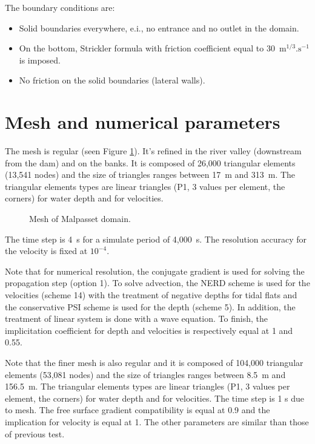 \bigskip
The boundary conditions are:
\begin{itemize}
\item Solid boundaries everywhere, e.i., no entrance and no outlet in the domain.
\item On the bottom, Strickler formula with friction coefficient equal 
to 30~$\text{m}^{1/3}.\text{s}^{-1}$ is imposed.
\item No friction on the solid boundaries (lateral walls).
\end{itemize}
%
\section{Mesh and numerical parameters}
\bigskip
The mesh is regular (seen Figure \ref{t2d:malpasset:fig:mesh}). It's refined 
in the river valley (downstream from the dam) and on the banks. It is composed 
of 26,000 triangular elements (13,541 nodes) and the size of triangles ranges between 
17~m and 313~m. The triangular elements types are linear triangles (P1, 3 values 
per element, the corners) for water depth and for velocities.
%
\begin{figure}[!htbp]
 \centering
 \caption{Mesh of Malpasset domain.}
 \label{t2d:malpasset:fig:mesh}
\end{figure}
%
\bigskip
The time step is 4~s  for a simulate period of 4,000~s. The resolution accuracy for 
the velocity is fixed at $10^{-4}$.

\bigskip
Note that for numerical resolution, the conjugate gradient is used for solving 
the propagation step (option 1). To solve advection, the NERD scheme is used 
for the velocities (scheme 14) with the treatment of negative
depths for tidal flats and the conservative PSI scheme is used for the depth (scheme 5). 
In addition, the treatment of linear system is done with a wave equation. 
To finish, the implicitation coefficient for depth and velocities is 
respectively equal at 1 and 0.55.

\bigskip
Note that the finer mesh is also regular and it is composed of 104,000 triangular 
elements (53,081 nodes) and the size of triangles 
ranges between 8.5~m and 156.5~m. The triangular elements types are linear triangles 
(P1, 3 values per element, the corners) for water depth and for velocities.
The time step is 1 s due to mesh. The free surface gradient compatibility is equal 
at 0.9 and the implication for velocity is equal at 1. The other parameters 
are similar than those of previous test.

